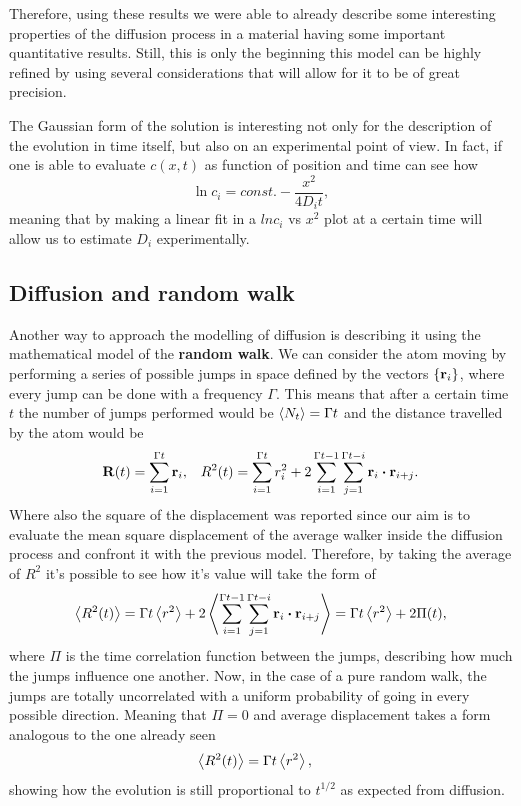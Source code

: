 Therefore, using these results we were able to already describe some interesting properties of the diffusion process in a material having some important quantitative results. Still, this is only the beginning this model can be highly refined by using several considerations that will allow for it to be of great precision.

\nt
{
    The Gaussian form of the solution is interesting not only for the description of the evolution in time itself, but also on an experimental point of view. In fact, if one is able to evaluate $c(x, t)$ as function of position and time can see how
    \begin{equation}
        \ln c_i = const. - \frac{x^2}{4D_it},
    \end{equation}
    meaning that by making a linear fit in a $ln c_i$ vs $x^2$ plot at a certain time will allow us to estimate $D_i$ experimentally.
}

\subsection{Diffusion and random walk}

Another way to approach the modelling of diffusion is describing it using the mathematical model of the \textbf{random walk}. We can consider the atom moving by performing a series of possible jumps in space defined by the vectors $\{\vb{r}_i\}$, where every jump can be done with a frequency $\Gamma$. This means that after a certain time $t$ the number of jumps performed would be $\left\langle N_{t} \right\rangle = \Gamma t$ and the distance travelled by the atom would be
\begin{align}
    &\vb{R}(t) = \sum_{i=1}^{\Gamma t} \vb{r}_i, &R^2(t) = \sum_{i=1}^{\Gamma t} r_i^2 + 2\sum_{i=1}^{\Gamma t - 1} \sum_{j=1}^{\Gamma t - i} \vb{r}_i \vdot \vb{r}_{i+j}.
\end{align}
Where also the square of the displacement was reported since our aim is to evaluate the mean square displacement of the average walker inside the diffusion process and confront it with the previous model. Therefore, by taking the average of $R^2$ it's possible to see how it's value will take the form of
\begin{equation}
    \label{eq:RandWalkMod}
    \mean{R^2(t)} = \Gamma t\mean{r^2} + 2\mean{\sum_{i=1}^{\Gamma t - 1} \sum_{j=1}^{\Gamma t - i} \vb{r}_i \vdot \vb{r}_{i+j}} = \Gamma t\mean{r^2} + 2\Pi(t),
\end{equation}
where $\Pi$ is the time correlation function between the jumps, describing how much the jumps influence one another. Now, in the case of a pure random walk, the jumps are totally uncorrelated with a uniform probability of going in every possible direction. Meaning that $\Pi = 0$ and average displacement takes a form analogous to the one already seen
\begin{align}
    &\left\langle R^2(t) \right\rangle = \Gamma t\left\langle r^2 \right\rangle,
\end{align}
showing how the evolution is still proportional to $t^{1/2}$ as expected from diffusion.

